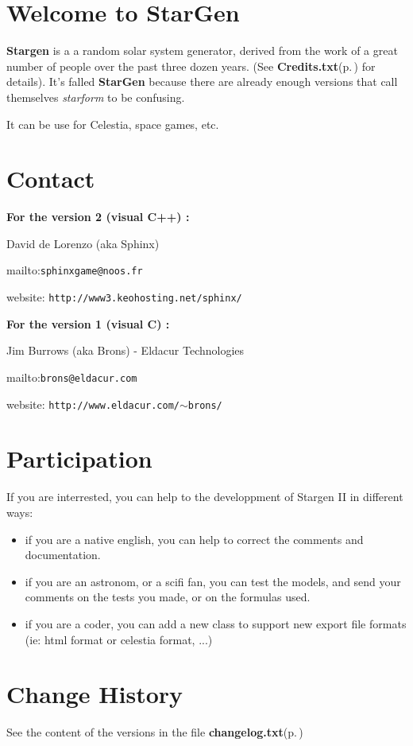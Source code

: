 \section{Welcome to Star\-Gen}\label{index_intro}
{\bf Stargen} is a a random solar system generator, derived from the work of a great number of people over the past three dozen years. (See {\bf Credits.txt}{\rm (p.\,\pageref{_credits_8txt})} for details). It's falled {\bf Star\-Gen} because there are already enough versions that call themselves {\em starform\/} to be confusing.\par
 It can be use for Celestia, space games, etc.\section{Contact}\label{index_contact}
{\bf For the version 2 (visual C++) :}\par
 David de Lorenzo (aka Sphinx)\par
 mailto:{\tt sphinxgame@noos.fr}\par
 website: {\tt http://www3.keohosting.net/sphinx/} \par
\par
 {\bf For the version 1 (visual C) :}\par
 Jim Burrows (aka Brons) - Eldacur Technologies\par
 mailto:{\tt brons@eldacur.com}\par
 website: {\tt http://www.eldacur.com/$\sim$brons/} \par
\par
\section{Participation}\label{index_participation}
If you are interrested, you can help to the developpment of Stargen II in different ways:\begin{itemize}
\item if you are a native english, you can help to correct the comments and documentation.\item if you are an astronom, or a scifi fan, you can test the models, and send your comments on the tests you made, or on the formulas used.\item if you are a coder, you can add a new class to support new export file formats (ie: html format or celestia format, ...)\end{itemize}
\section{Change History}\label{index_changelog}
See the content of the versions in the file {\bf changelog.txt}{\rm (p.\,\pageref{changelog_8txt})} 